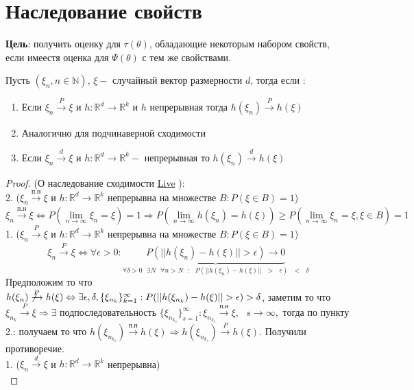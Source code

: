 \documentclass[11pt,fleqn]{book} %
\def\R{\mathbb{R}}
\def\t{\theta}
\def\s{\textit{  }}
\def\d{\xrightarrow[] {d}}
\def\PN{\xrightarrow[] {\textit{п.н}}}
\def\PT{\xrightarrow[] {P}}
\def\NP{\not\xrightarrow[] {P}}
\begin{document}
\section{Наследование свойств}
\textbf{Цель}: получить оценку для $\tau(\t)$, обладающие некоторым набором свойств, если имеестя оценка для  $\Psi(\t)$ с тем же свойствами. 

\begin{theorem}
\label{th_nasledovanoiy_shod}
Пусть $(\xi_n , n\in \mathbb{N})$, $\xi - $ случайный вектор размерности $d$, тогда если :
\begin{enumerate}
\item Если $\xi_n \PT \xi$ и $h: \mathbb{R}^d \rightarrow \mathbb{R}^k$ и $h$ непрерывная тогда $ h(\xi_n) \PT h(\xi)$ 
\item Аналогично для подчинаверной сходимости 
\item Если $\xi_n \d \xi$ и $h: \mathbb{R}^d \rightarrow \mathbb{R}^k - $ непрерывная то $h(\xi_n) \d h(\xi)$
\end{enumerate}
\end{theorem}
\begin{proof}(О наследование сходимости \href{https://youtu.be/EL-V_0kWRoI?t=951}{Live} ):  \\
2. ($\xi_n \PN \xi$ и $h:\R^d \to \R^k$ непрерывна на множестве $B: P(\xi \in B) = 1$)\\ 
$$\xi_n \PN \xi \Leftrightarrow P( \lim_{n \to \infty} \xi_n = \xi) = 1 \Rightarrow P(\lim_{n \to \infty} h(\xi_n) = h(\xi)) \geq P(\lim_{n\to \infty} \xi_n = \xi, \xi \in B) = 1$$
1. ($\xi_n \PT \xi$ и $h:\R^d \to \R^k$ непрерывна на множестве $B: P(\xi \in B) = 1$)\\ 
$$\xi_n \PT \xi \Leftrightarrow \forall \epsilon > 0: \underbrace{P(||h(\xi_n) - h(\xi)|| > \epsilon) \to 0}_{\forall \delta > 0 \s \exists N  \s \forall n > N \s :  \s P(||h(\xi_n) - h(\xi) || \s  > \s  \epsilon)  \s <  \s \delta} $$  Предположим то что $h(\xi_n) \NP h(\xi) \Leftrightarrow \exists \epsilon, \delta, \{\xi_{n_k}\}^{\infty}_{k = 1}: P(||h(\xi_{n_k}) - h(\xi) || > \epsilon) > \delta $,  заметим то что $\xi_{n_k} \PT \xi \Rightarrow \exists$ подпоследовательность $\{\xi_{n_{k_s}}\}^{\infty}_{s = 1} : \xi_{n_{k_s}} \PN \xi, \s s \to \infty, $ тогда по пункту 2.: получаем то что $h(\xi_{n_{k_s}}) \PN h(\xi) \Rightarrow h(\xi_{n_{k_s}}) \PT h(\xi)$. Получили противоречие. \\
1. ($\xi_n \d \xi$ и $h:\R^d \to \R^k$ непрерывна)\\


\end{proof}
\end{document}
